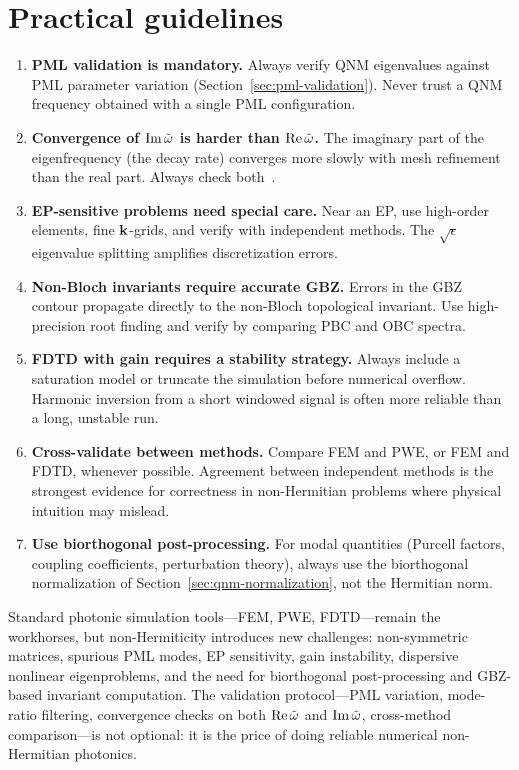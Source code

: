 \section{Practical guidelines}
\label{sec:numerical-guidelines}

\begin{enumerate}
 \item \textbf{PML validation is mandatory.} Always verify QNM
 eigenvalues against PML parameter variation
 (Section~\ref{sec:pml-validation}). Never trust a QNM frequency
 obtained with a single PML configuration.

 \item \textbf{Convergence of $\operatorname{Im}\tilde{\omega}$ is harder than $\operatorname{Re}\tilde{\omega}$.}
 The imaginary part of the eigenfrequency (the decay rate) converges
 more slowly with mesh refinement than the real part. Always check
 both~\cite{jgopalakrishnan2022computing}.

 \item \textbf{EP-sensitive problems need special care.} Near an EP,
 use high-order elements, fine $\mathbf{k}$-grids, and verify with
 independent methods. The $\sqrt{\epsilon}$ eigenvalue splitting
 amplifies discretization errors.

 \item \textbf{Non-Bloch invariants require accurate GBZ.} Errors
 in the GBZ contour propagate directly to the non-Bloch topological
 invariant. Use high-precision root finding and verify by comparing
 PBC and OBC spectra.

 \item \textbf{FDTD with gain requires a stability strategy.} Always
 include a saturation model or truncate the simulation before
 numerical overflow. Harmonic inversion from a short windowed
 signal is often more reliable than a long, unstable run.

 \item \textbf{Cross-validate between methods.} Compare FEM and PWE,
 or FEM and FDTD, whenever possible. Agreement between independent
 methods is the strongest evidence for correctness in non-Hermitian
 problems where physical intuition may mislead.

 \item \textbf{Use biorthogonal post-processing.} For modal
 quantities (Purcell factors, coupling coefficients, perturbation
 theory), always use the biorthogonal normalization of
 Section~\ref{sec:qnm-normalization}, not the Hermitian norm.
\end{enumerate}

\begin{takeaway}
Standard photonic simulation tools---FEM, PWE, FDTD---remain the
workhorses, but non-Hermiticity introduces new challenges: non-symmetric
matrices, spurious PML modes, EP sensitivity, gain instability,
dispersive nonlinear eigenproblems, and the need for biorthogonal
post-processing and GBZ-based invariant computation. The validation
protocol---PML variation, mode-ratio filtering, convergence checks on
both $\operatorname{Re}\tilde{\omega}$ and $\operatorname{Im}\tilde{\omega}$, cross-method comparison---is not
optional: it is the price of doing reliable numerical non-Hermitian
photonics.
\end{takeaway}
